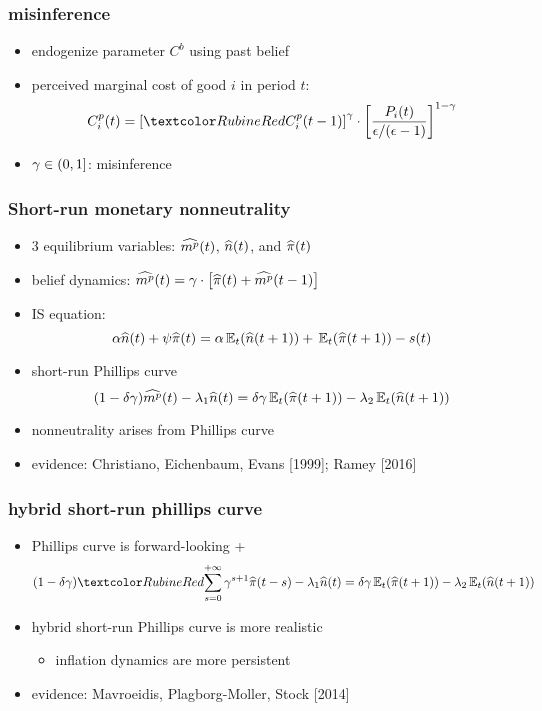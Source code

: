 \documentclass[12pt,xcolor={dvipsnames},hyperref={pdftex,pdfpagemode=UseNone,hidelinks,pdfdisplaydoctitle=true},usepdftitle=false]{beamer}
\begin{document}
\begin{frame}
\frametitle{misinference}
\begin{itemize}
\item endogenize parameter $C^b$ using past belief
\item perceived marginal cost of good $i$ in period $t$:
\begin{equation*}
C^{p}_{i}(t)= \bs{\al{C^{p}_{i}(t-1)}}^{\g} \cdot \bs{\frac{P_{i}(t)}{\e/(\e-1)}}^{1-\g}
\end{equation*}
\item $\gamma\in(0,1]$: misinference
\end{itemize}
\end{frame}

\begin{frame}
\frametitle{Short-run monetary nonneutrality}
\begin{itemize}
\item 3 equilibrium variables: $\widehat{m^p}(t)$, $\widehat{n}(t)$, and $\widehat{\pi}(t)$
\item belief dynamics: $\widehat{m^p}(t) = \gamma \cdot \left[ \widehat{\pi}(t) + \widehat{m^p}(t-1) \right]$
\item IS equation:
\begin{equation*}
\a \wh{n}(t) +\psi \wh{\pi}(t)= \a \E[t]{\wh{n}(t+1)}+\E[t]{\wh{\pi}(t+1)} - s(t)
\end{equation*}    	
\item short-run Phillips curve
\begin{equation*}
(1-\d\g) \wh{m^p}(t) -\l_1 \wh{n}(t) = \d\g \E[t]{\wh{\pi}(t+1)} -\l_2 \E[t]{\wh{n}(t+1)}
\end{equation*}
\item nonneutrality arises from Phillips curve
\item evidence: Christiano, Eichenbaum, Evans [1999]; Ramey [2016]
\end{itemize}
\end{frame}

\begin{frame}
\frametitle{hybrid short-run phillips curve}
\begin{itemize}
\item Phillips curve is forward-looking + 
\begin{equation*}
(1-\d\g) \al{\sum_{s=0}^{+\infty}\g^{s+1} \wh{\pi}(t-s)} -\l_1 \wh{n}(t)  = \d\g \E[t]{\wh{\pi}(t+1)} -\l_2 \E[t]{\wh{n}(t+1)}
\end{equation*}
\item hybrid short-run Phillips curve is more realistic
\begin{itemize}
	\item inflation dynamics are more persistent
\end{itemize}
\item evidence: Mavroeidis, Plagborg-Moller, Stock [2014]
\end{itemize}
\end{frame}
\end{document}
